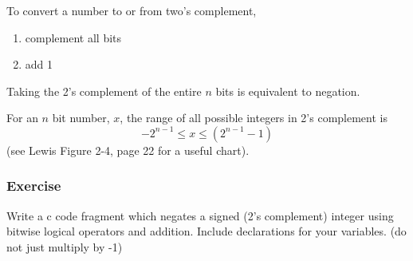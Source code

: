 To convert a number to or from two's complement,
\begin{enumerate}
  \item complement all bits
  \item add 1
\end{enumerate}
Taking the 2's complement of the entire $n$ bits is equivalent to negation.

For an $n$ bit number, $x$,  the range of all possible integers in 2's complement is
\[
-2^{n-1} \leq x \leq (2^{n-1}-1)
\]
(see Lewis Figure 2-4, page 22 for a useful chart).


\subsubsection{Exercise}

Write a c code fragment which negates a signed (2's complement) integer
using bitwise logical operators and addition.  Include declarations for
your variables.
(do not just multiply by -1)


\vspace{3.0in}	%

%
%
%
%
%
%
%
%
%
